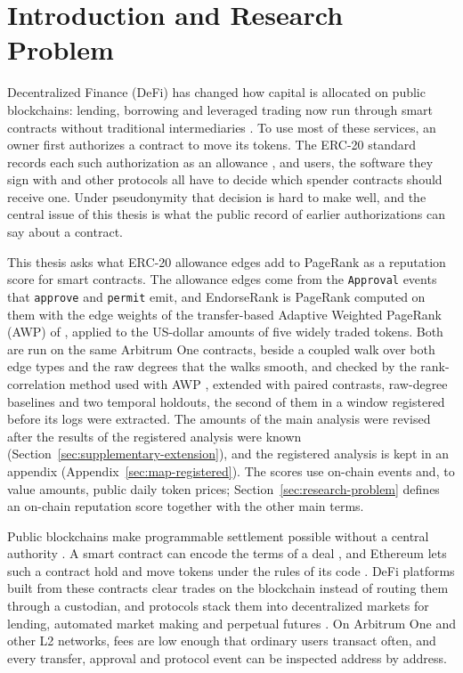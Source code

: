 \chapter{Introduction and Research Problem}
\label{ch:introduction}

Decentralized Finance (DeFi) has changed how capital is allocated on public blockchains: lending, borrowing and leveraged trading now run through smart contracts without traditional intermediaries \parencite{schar2021defi}. To use most of these services, an owner first authorizes a contract to move its tokens. The ERC-20 standard records each such authorization as an allowance \parencite{vogelsteller2015erc20}, and users, the software they sign with and other protocols all have to decide which spender contracts should receive one. Under pseudonymity that decision is hard to make well, and the central issue of this thesis is what the public record of earlier authorizations can say about a contract.

This thesis asks what ERC-20 allowance edges add to PageRank as a reputation score for smart contracts. The allowance edges come from the \texttt{Approval} events that \texttt{approve} and \texttt{permit} emit, and EndorseRank is PageRank computed on them with the edge weights of the transfer-based Adaptive Weighted PageRank (AWP) of \textcite{do2023awp}, applied to the US-dollar amounts of five widely traded tokens. Both are run on the same Arbitrum One contracts, beside a coupled walk over both edge types and the raw degrees that the walks smooth, and checked by the rank-correlation method used with AWP \parencite{do2023awp}, extended with paired contrasts, raw-degree baselines and two temporal holdouts, the second of them in a window registered before its logs were extracted. The amounts of the main analysis were revised after the results of the registered analysis were known (Section~\ref{sec:supplementary-extension}), and the registered analysis is kept in an appendix (Appendix~\ref{sec:map-registered}). The scores use on-chain events and, to value amounts, public daily token prices; Section~\ref{sec:research-problem} defines an on-chain reputation score together with the other main terms.


Public blockchains make programmable settlement possible without a central authority \parencite{nakamoto2008bitcoin}. A smart contract can encode the terms of a deal \parencite{szabo1997formalizing}, and Ethereum lets such a contract hold and move tokens under the rules of its code \parencite{buterin2014ethereum}. DeFi platforms built from these contracts clear trades on the blockchain instead of routing them through a custodian, and protocols stack them into decentralized markets for lending, automated market making and perpetual futures \parencite{werner2022sok}. On Arbitrum One and other L2 networks, fees are low enough that ordinary users transact often, and every transfer, approval and protocol event can be inspected address by address.

